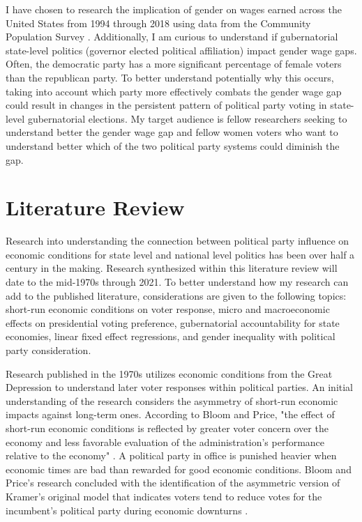 \documentclass[12pt, English]{article}
\begin{document}
I have chosen to research the implication of gender on wages earned across the United States from 1994 through 2018 using data from the Community Population Survey \citep{IPUMSUSA}. Additionally, I am curious to understand if gubernatorial state-level politics (governor elected political affiliation) impact gender wage gaps. Often, the democratic party has a more significant percentage of female voters than the republican party. To better understand potentially why this occurs, taking into account which party more effectively combats the gender wage gap could result in changes in the persistent pattern of political party voting in state-level gubernatorial elections. My target audience is fellow researchers seeking to understand better the gender wage gap and fellow women voters who want to understand better which of the two political party systems could diminish the gap. 


\newpage



\section{Literature Review}
Research into understanding the connection between political party influence on economic conditions for state level and national level politics has been over half a century in the making. Research synthesized within this literature review will date to the mid-1970s through 2021. To better understand how my research can add to the published literature, considerations are given to the following topics: short-run economic conditions on voter response, micro and macroeconomic effects on presidential voting preference, gubernatorial accountability for state economies, linear fixed effect regressions, and gender inequality with political party consideration. 

Research published in the 1970s utilizes economic conditions from the Great Depression to understand later voter responses within political parties. An initial understanding of the research considers the asymmetry of short-run economic impacts against long-term ones. According to Bloom and Price, "the effect of short-run economic conditions is reflected by greater voter concern over the economy and less favorable evaluation of the administration's performance relative to the economy" \citep{bloom1975voter}. A political party in office is punished heavier when economic times are bad than rewarded for good economic conditions. Bloom and Price's research concluded with the identification of the asymmetric version of Kramer's original model that indicates voters tend to reduce votes for the incumbent's political party during economic downturns \citep{bloom1975voter}. 
\end{document}
